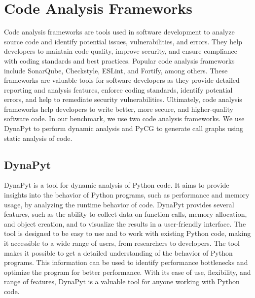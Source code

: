 \section{Code Analysis Frameworks}
Code analysis frameworks are tools used in software development to analyze source code and identify potential issues, vulnerabilities, and errors.
They help developers to maintain code quality, improve security, and ensure compliance with coding standards and best practices.
Popular code analysis frameworks include SonarQube, Checkstyle, ESLint, and Fortify, among others. \cite{static_code_analysis_tools}
These frameworks are valuable tools for software developers as they provide detailed reporting and analysis features, enforce coding standards, identify potential errors, and help to remediate security vulnerabilities.
Ultimately, code analysis frameworks help developers to write better, more secure, and higher-quality software code. \cite{Code_analysis_1, Code_analysis_2, static_code_analysis}
In our benchmark, we use two code analysis frameworks.
We use DynaPyt to perform dynamic analysis and PyCG to generate call graphs using static analysis of code.

\subsection{DynaPyt}
DynaPyt \cite{DynaPyt2022} is a tool for dynamic analysis of Python code.
It aims to provide insights into the behavior of Python programs, such as performance and memory usage, by analyzing the runtime behavior of code.
DynaPyt provides several features, such as the ability to collect data on function calls, memory allocation, and object creation, and to visualize the results in a user-friendly interface.
The tool is designed to be easy to use and to work with existing Python code, making it accessible to a wide range of users, from researchers to developers.
The tool makes it possible to get a detailed understanding of the behavior of Python programs.
This information can be used to identify performance bottlenecks and optimize the program for better performance.
With its ease of use, flexibility, and range of features, DynaPyt is a valuable tool for anyone working with Python code.

